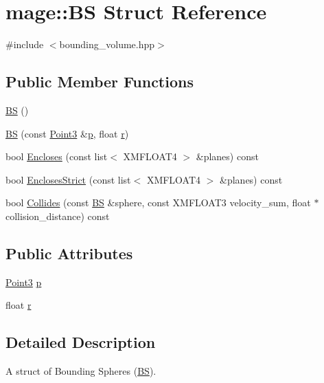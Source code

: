 \hypertarget{structmage_1_1_b_s}{}\section{mage\+:\+:BS Struct Reference}
\label{structmage_1_1_b_s}


{\ttfamily \#include $<$bounding\+\_\+volume.\+hpp$>$}

\subsection*{Public Member Functions}
\begin{DoxyCompactItemize}
\item 
\hyperlink{structmage_1_1_b_s_aa34921d9ea23b9a724ddf739b3adabfa}{BS} ()
\item 
\hyperlink{structmage_1_1_b_s_a23be36778ebc6b31fcfb31fb032fdb0e}{BS} (const \hyperlink{structmage_1_1_point3}{Point3} \&\hyperlink{structmage_1_1_b_s_a9c6ad8f37fa6b98179e8108c8584fdcf}{p}, float \hyperlink{structmage_1_1_b_s_ab2e786e8493feb28a3bc0216e8dea5bc}{r})
\item 
bool \hyperlink{structmage_1_1_b_s_a2ec64c652e8bf5417791958246d300cb}{Encloses} (const list$<$ X\+M\+F\+L\+O\+A\+T4 $>$ \&planes) const
\item 
bool \hyperlink{structmage_1_1_b_s_a6d9380b5a9a9aa59b7922b5be8e26e74}{Encloses\+Strict} (const list$<$ X\+M\+F\+L\+O\+A\+T4 $>$ \&planes) const
\item 
bool \hyperlink{structmage_1_1_b_s_a06f94772c3efd24c61cff33c018182f3}{Collides} (const \hyperlink{structmage_1_1_b_s}{BS} \&sphere, const X\+M\+F\+L\+O\+A\+T3 velocity\+\_\+sum, float $\ast$collision\+\_\+distance) const
\end{DoxyCompactItemize}
\subsection*{Public Attributes}
\begin{DoxyCompactItemize}
\item 
\hyperlink{structmage_1_1_point3}{Point3} \hyperlink{structmage_1_1_b_s_a9c6ad8f37fa6b98179e8108c8584fdcf}{p}
\item 
float \hyperlink{structmage_1_1_b_s_ab2e786e8493feb28a3bc0216e8dea5bc}{r}
\end{DoxyCompactItemize}


\subsection{Detailed Description}
A struct of Bounding Spheres (\hyperlink{structmage_1_1_b_s}{BS}). 

